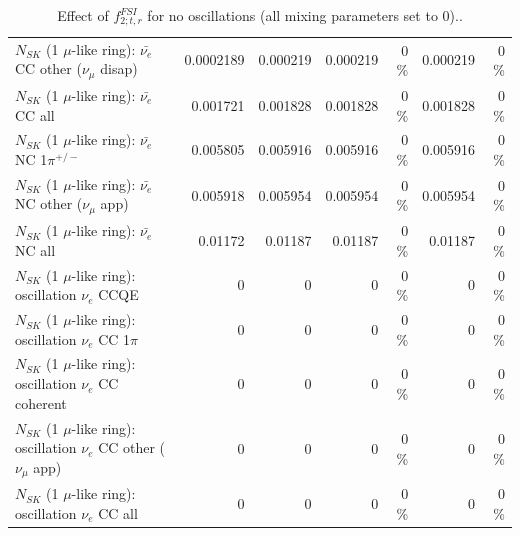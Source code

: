 \begin{table}
\begin{tabular}{| l | r | r | r  r | r  r |}
          $N_{SK}$ (1 $\mu$-like ring): $\bar{\nu_e}$ CC other ($\nu_\mu$ disap) &       0.0002189 &        0.000219 &        0.000219 &        0 \%  &        0.000219 &        0 \%  \\ 
                            $N_{SK}$ (1 $\mu$-like ring): $\bar{\nu_{e}}$ CC all &        0.001721 &        0.001828 &        0.001828 &        0 \%  &        0.001828 &        0 \%  \\ 
\hline
                     $N_{SK}$ (1 $\mu$-like ring): $\bar{\nu_e}$ NC 1$\pi^{+/-}$ &        0.005805 &        0.005916 &        0.005916 &        0 \%  &        0.005916 &        0 \%  \\ 
            $N_{SK}$ (1 $\mu$-like ring): $\bar{\nu_e}$ NC other ($\nu_\mu$ app) &        0.005918 &        0.005954 &        0.005954 &        0 \%  &        0.005954 &        0 \%  \\ 
                            $N_{SK}$ (1 $\mu$-like ring): $\bar{\nu_{e}}$ NC all &         0.01172 &         0.01187 &         0.01187 &        0 \%  &         0.01187 &        0 \%  \\ 
\hline
\hline
\hline
                          $N_{SK}$ (1 $\mu$-like ring): oscillation $\nu_e$ CCQE &               0 &               0 &               0 &        0 \%  &               0 &        0 \%  \\ 
                     $N_{SK}$ (1 $\mu$-like ring): oscillation $\nu_e$ CC 1$\pi$ &               0 &               0 &               0 &        0 \%  &               0 &        0 \%  \\ 
                   $N_{SK}$ (1 $\mu$-like ring): oscillation $\nu_e$ CC coherent &               0 &               0 &               0 &        0 \%  &               0 &        0 \%  \\ 
      $N_{SK}$ (1 $\mu$-like ring): oscillation $\nu_e$ CC other ($\nu_\mu$ app) &               0 &               0 &               0 &        0 \%  &               0 &        0 \%  \\ 
                       $N_{SK}$ (1 $\mu$-like ring): oscillation $\nu_e$  CC all &               0 &               0 &               0 &        0 \%  &               0 &        0 \%  \\ 
\hline
\hline
\end{tabular}
\caption{ Effect of $f_{2; t, r}^{FSI}$ for no oscillations (all mixing parameters set to 0).. }
\label{tab:num_fsi_002_1RmuT_3f_osc_t13:0_spectralreco_spectraltrue}
\end{table}
\clearpage
